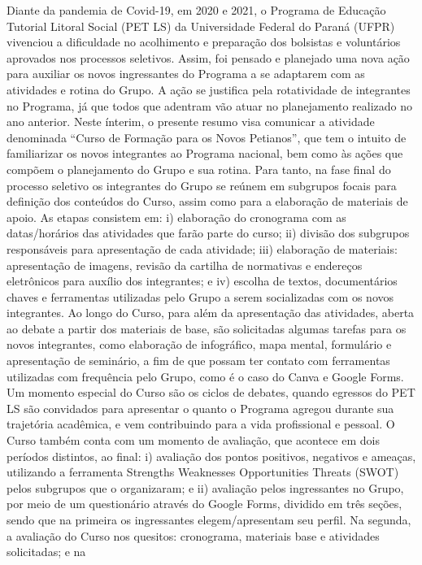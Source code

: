 Diante da pandemia de Covid-19, em 2020 e 2021, o Programa de Educação Tutorial Litoral 
Social (PET LS) da Universidade Federal do Paraná (UFPR) vivenciou a dificuldade no 
acolhimento e preparação dos bolsistas e voluntários aprovados nos processos seletivos. Assim, 
foi pensado e planejado uma nova ação para auxiliar os novos ingressantes do Programa a se 
adaptarem com as atividades e rotina do Grupo. A ação se justifica pela rotatividade de 
integrantes no Programa, já que todos que adentram vão atuar no planejamento realizado no ano 
anterior. Neste ínterim, o presente resumo visa comunicar a atividade denominada “Curso de 
Formação para os Novos Petianos”, que tem o intuito de familiarizar os novos integrantes ao 
Programa nacional, bem como às ações que compõem o planejamento do Grupo e sua rotina. 
Para tanto, na fase final do processo seletivo os integrantes do Grupo se reúnem em subgrupos
focais para definição dos conteúdos do Curso, assim como para a elaboração de materiais de 
apoio. As etapas consistem em: i) elaboração do cronograma com as datas/horários das 
atividades que farão parte do curso; ii) divisão dos subgrupos responsáveis para apresentação de 
cada atividade; iii) elaboração de materiais: apresentação de imagens, revisão da cartilha de 
normativas e endereços eletrônicos para auxílio dos integrantes; e iv) escolha de textos,
documentários chaves e ferramentas utilizadas pelo Grupo a serem socializadas com os novos 
integrantes. Ao longo do Curso, para além da apresentação das atividades, aberta ao debate a 
partir dos materiais de base, são solicitadas algumas tarefas para os novos integrantes, como 
elaboração de infográfico, mapa mental, formulário e apresentação de seminário, a fim de que 
possam ter contato com ferramentas utilizadas com frequência pelo Grupo, como é o caso do 
Canva e Google Forms. Um momento especial do Curso são os ciclos de debates, quando
egressos do PET LS são convidados para apresentar o quanto o Programa agregou durante sua 
trajetória acadêmica, e vem contribuindo para a vida profissional e pessoal. O Curso também 
conta com um momento de avaliação, que acontece em dois períodos distintos, ao final: i) 
avaliação dos pontos positivos, negativos e ameaças, utilizando a ferramenta Strengths 
Weaknesses Opportunities Threats (SWOT) pelos subgrupos que o organizaram; e ii) avaliação 
pelos ingressantes no Grupo, por meio de um questionário através do Google Forms, dividido em 
três seções, sendo que na primeira os ingressantes elegem/apresentam seu perfil. Na segunda, a
avaliação do Curso nos quesitos: cronograma, materiais base e atividades solicitadas; e na
